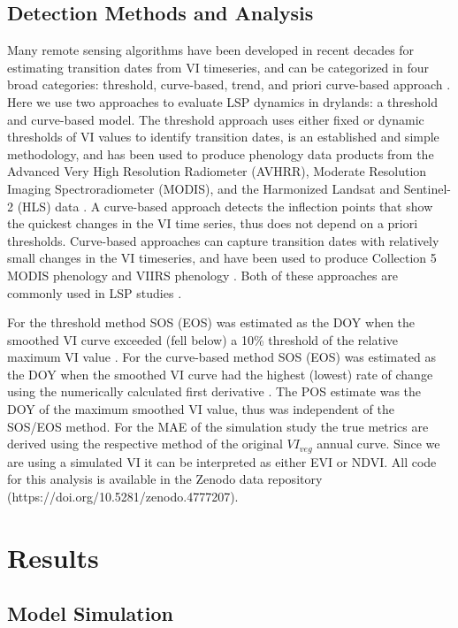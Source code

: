 \documentclass{article}
\begin{document}
\subsection{Detection Methods and Analysis}
Many remote sensing algorithms have been developed in recent decades for estimating transition dates from VI timeseries, and can be categorized in four broad categories: threshold, curve-based, trend, and priori curve-based approach \cite{gao-zhang2021, zeng-wardlow2020}. Here we use two approaches to evaluate LSP dynamics in drylands: a threshold and curve-based model. The threshold approach uses either fixed or dynamic thresholds of VI values to identify transition dates, is an established and simple methodology, and has been used to produce phenology data products from the Advanced Very High Resolution Radiometer (AVHRR), Moderate Resolution Imaging Spectroradiometer (MODIS), and the Harmonized Landsat and Sentinel-2 (HLS) data \cite{jonsson2004, gray2019, bolton2020}. A curve-based approach detects the inflection points that show the quickest changes in the VI time series, thus does not depend on a priori thresholds. Curve-based approaches can capture transition dates with relatively small changes in the VI timeseries, and have been used to produce Collection 5 MODIS phenology and VIIRS phenology \cite{zhang-friedl2003, zhang-liu2018}. Both of these approaches are commonly used in LSP studies \cite{garonna2016, jeong2011, buitenwerf2015}. 

For the threshold method SOS (EOS) was estimated as the DOY when the smoothed VI curve exceeded (fell below) a 10\% threshold of the relative maximum VI value \cite{white2007}. For the curve-based method SOS (EOS) was estimated as the DOY when the smoothed VI curve had the highest (lowest) rate of change using the numerically calculated first derivative \cite{tateishi2004}. The POS estimate was the DOY of the maximum smoothed VI value, thus was independent of the SOS/EOS method. For the MAE of the simulation study the true metrics are derived using the respective method of the original $VI_{veg}$ annual curve. Since we are using a simulated VI it can be interpreted as either EVI or NDVI. All code for this analysis is available in the Zenodo data repository (https://doi.org/10.5281/zenodo.4777207).


\section{Results}

\subsection{Model Simulation}
\end{document}
